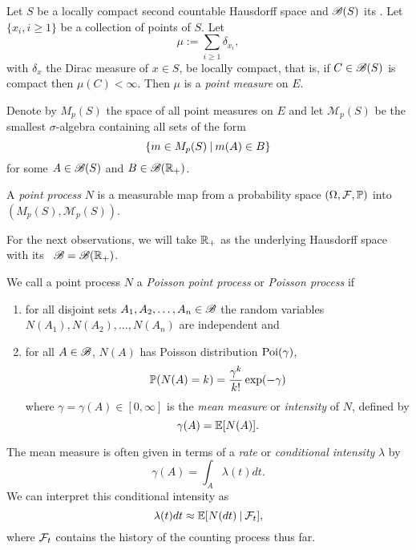 \begin{definition} \label{D: point process}
	Let $S$ be a locally compact second countable Hausdorff space
	and $\mathscr{B}(S)$ its \Bosi.
	Let $\{x_i, i \geq 1\}$ be a collection of points of $S$.
	Let
	\begin{equation}
		\mu := \sum_{i \geq 1} \delta_{x_i},
	\end{equation}
	with $\delta_x$ the Dirac measure of $x \in S$,
	be locally compact, that is, 
	if $C \in \mathscr{B}(S)$ is compact then $\mu(C) < \infty$.
	Then $\mu$ is a \emph{point measure} on $E$.
	
	Denote by $M_p(S)$ the space of all point measures on $E$
	and let $\mathscr{M}_p(S)$ be the smallest $\sigma$-algebra containing all sets of the form
	\begin{equation*}
		\{ m \in M_p(S) \: | \: m(A) \in B \}
	\end{equation*}
	for some $A \in \mathscr{B}(S)$ and $B \in \mathscr{B}(\mathbb{R}_+)$.
	
	A \emph{point process} $N$ is a measurable map from a probability space
	$(\Omega, \mathcal{F}, \mathbb{P})$ into $(M_p(S), \mathscr{M}_p(S))$.
\end{definition}

\bigskip

For the next observations, we will take $\mathbb{R}_+$ as the underlying Hausdorff space with its \Bosi~$\mathscr{B} = \mathscr{B}(\mathbb{R}_+)$.

\begin{definition} \label{D: poisson process}
	We call a point process $N$ a \emph{Poisson point process} or \emph{Poisson process}
	if
	\begin{enumerate}
		\item for all disjoint sets $A_1, A_2, \dots, A_n \in \mathscr{B}$
			the random variables $N(A_1), N(A_2), \dots, N(A_n)$ are independent and
		\item for all $A \in \mathscr{B}$, $N(A)$ has Poisson distribution $\operatorname*{Poi}(\gamma)$,
			\begin{equation*}
				\mathbb{P}(N(A) = k) = \frac{\gamma^k}{k!}\exp(-\gamma)
			\end{equation*}
			where $\gamma = \gamma(A) \in [0, \infty]$ is the \emph{mean measure} or \emph{intensity} of $N$,
			defined by
			\begin{equation}
				\gamma(A) = \mathbb{E}[ N(A) ].
			\end{equation}
	\end{enumerate}
	The mean measure is often given in terms of a \emph{rate} or \emph{conditional intensity} $\lambda$ by
	\begin{equation}
		\gamma(A) = \int_A \lambda(t)dt.
	\end{equation}
	We can interpret this conditional intensity as
	\begin{equation}
		\lambda(t)dt \approx \mathbb{E}[ N(dt) \: | \: \mathcal{F}_{t} ] ,
	\end{equation}
	where $\mathcal{F}_{t}$ contains the history of the counting process thus far.
\end{definition}

